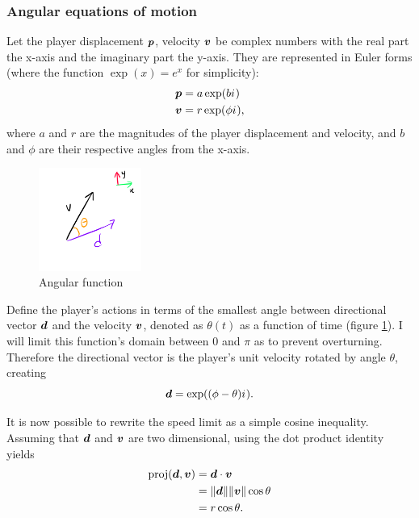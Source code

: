 
\subsubsection{Angular equations of motion}
Let the player displacement $\boldsymbol{p}$, velocity $\boldsymbol{v}$ be complex numbers with the real part the x-axis and the imaginary part the y-axis. They are represented in Euler forms (where the function $\exp(x)= e^{x}$ for simplicity):
\begin{align*}
    \boldsymbol{p} &= a \exp(b {i\mkern1mu})\\
    \boldsymbol{v} &= r \exp(\phi {i\mkern1mu}),
\end{align*}
where $a$ and $r$ are the magnitudes of the player displacement and velocity, and $b$ and $\phi$ are their respective angles from the x-axis.

\begin{figure}
    \includegraphics[width=0.3\textwidth,right]{assets/angular_freedom.png}
    \caption{\vspace{1ex} Angular function}
    \label{fig:angular_freedom}
\end{figure}

Define the player's actions in terms of the smallest angle between directional vector $\boldsymbol{d}$ and the velocity $\boldsymbol{v}$, denoted as $\theta(t)$ as a function of time (figure \ref{fig:angular_freedom}). I will limit this function's domain between $0$ and $\pi$ as to prevent overturning. Therefore the directional vector is the player's unit velocity rotated by angle $\theta$, creating
\[
\boldsymbol{d} = \exp((\phi - \theta) {i\mkern1mu}).
\]


%
It is now possible to rewrite the speed limit as a simple cosine inequality. Assuming that $\boldsymbol{d}$ and $\boldsymbol{v}$ are two dimensional, using the dot product identity yields
\begin{align*}
    \text{proj}(\boldsymbol{d}, \boldsymbol{v}) &= \boldsymbol{d} \cdot \boldsymbol{v}\\
    &= \|\boldsymbol{d}\| \|\boldsymbol{v}\| \cos \theta\\
    &= r \cos \theta.
\end{align*}



